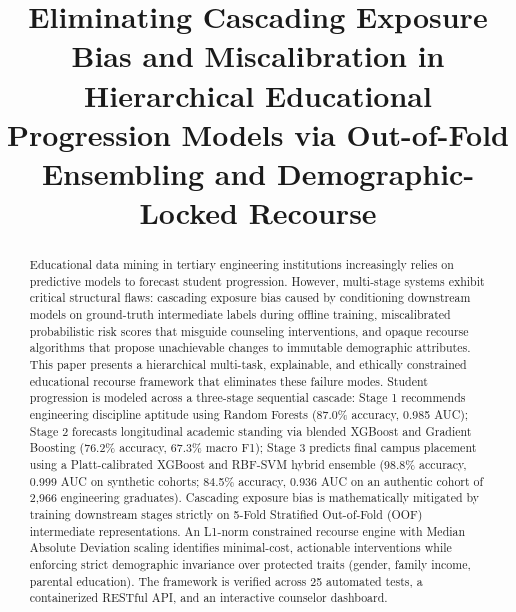 \documentclass[conference]{IEEEtran}
\begin{document}
\title{Eliminating Cascading Exposure Bias and Miscalibration in Hierarchical Educational Progression Models via Out-of-Fold Ensembling and Demographic-Locked Recourse}

\author{
}

\maketitle

\begin{abstract}
Educational data mining in tertiary engineering institutions increasingly relies on predictive models to forecast student progression. However, multi-stage systems exhibit critical structural flaws: cascading exposure bias caused by conditioning downstream models on ground-truth intermediate labels during offline training, miscalibrated probabilistic risk scores that misguide counseling interventions, and opaque recourse algorithms that propose unachievable changes to immutable demographic attributes. This paper presents a hierarchical multi-task, explainable, and ethically constrained educational recourse framework that eliminates these failure modes. Student progression is modeled across a three-stage sequential cascade: Stage 1 recommends engineering discipline aptitude using Random Forests (87.0\% accuracy, 0.985 AUC); Stage 2 forecasts longitudinal academic standing via blended XGBoost and Gradient Boosting (76.2\% accuracy, 67.3\% macro F1); Stage 3 predicts final campus placement using a Platt-calibrated XGBoost and RBF-SVM hybrid ensemble (98.8\% accuracy, 0.999 AUC on synthetic cohorts; 84.5\% accuracy, 0.936 AUC on an authentic cohort of 2,966 engineering graduates). Cascading exposure bias is mathematically mitigated by training downstream stages strictly on 5-Fold Stratified Out-of-Fold (OOF) intermediate representations. An L1-norm constrained recourse engine with Median Absolute Deviation scaling identifies minimal-cost, actionable interventions while enforcing strict demographic invariance over protected traits (gender, family income, parental education). The framework is verified across 25 automated tests, a containerized RESTful API, and an interactive counselor dashboard.
\end{abstract}
\end{document}
